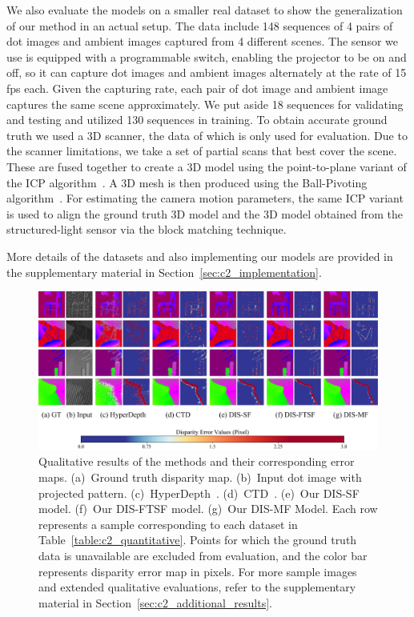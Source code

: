 We also evaluate the models on a smaller real dataset to show the generalization of our method in an actual setup. The data include 148 sequences of 4 pairs of dot images and ambient images captured from 4 different scenes. The sensor we use is equipped with a programmable switch, enabling the projector to be on and off, so it can capture dot images and ambient images alternately at the rate of 15 fps each. Given the capturing rate, each pair of dot image and ambient image captures the same scene approximately. We put aside 18 sequences for validating and testing and utilized 130 sequences in training. To obtain accurate ground truth we used a 3D scanner, the data of which is only used for evaluation. Due to the scanner limitations, we take a set of partial scans that best cover the scene. These are fused together to create a 3D model using the point-to-plane variant of the ICP algorithm~\citep{Chen1992ObjectMB}. A 3D mesh is then produced using the Ball-Pivoting algorithm~\citep{bernardini99ball}. For estimating the camera motion parameters, the same ICP variant is used to align the ground truth 3D model and the 3D model obtained from the structured-light sensor via the block matching technique.

More details of the datasets and also implementing our models are provided in the supplementary material in Section~\ref{sec:c2_implementation}.

\begin{figure}
    \begin{center}
        \includegraphics[width=1\linewidth]{images/chapter2/figures/Fig4.jpg}
    \end{center}
   \caption{Qualitative results of the methods and their corresponding error maps. (a)~Ground truth disparity map. (b)~Input dot image with projected pattern. (c)~HyperDepth~\citep{ryan2016hyperdepth}. (d)~CTD~\citep{riegler2019connecting}. (e)~Our DIS-SF model. (f)~Our DIS-FTSF model. (g)~Our DIS-MF Model. Each row represents a sample corresponding to each dataset in Table~\ref{table:c2_quantitative}. Points for which the ground truth data is unavailable are excluded from evaluation, and the color bar represents disparity error map in pixels. For more sample images and extended qualitative evaluations, refer to the supplementary material in Section~\ref{sec:c2_additional_results}.}
    \label{fig:c2_results}
\end{figure}

